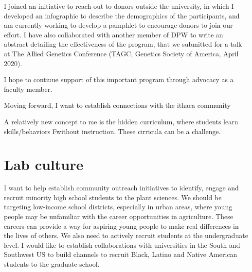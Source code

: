 \documentclass[11pt]{article}
\begin{document}

I joined an initiative to reach out to donors outside the university, in which I developed an infographic to describe the demographics of the participants, and am currently working to develop a pamphlet to encourage donors to join our effort. I have also collaborated with another member of DPW to write an abstract detailing the effectiveness of the program, that we submitted for a talk at The Allied Genetics Conference (TAGC, Genetics Society of America, April 2020).

I hope to continue support of this important program through advocacy as a faculty member.  

Moving forward, I want to establish connections with the ithaca community 


A relatively new concept to me is the hidden curriculum, where students learn skills/behaviors Fwithout instruction. These cirricula can be a challenge. 

\section{Lab culture}








I want to help establish community outreach initiatives to identify, engage and recruit minority high school students to the plant sciences. We should be targeting low-income school districts, especially in urban areas, where young people may be unfamiliar with the career opportunities in agriculture. These careers can provide a way for aspiring young people to make real differences in the lives of others. We also need to actively recruit students at the undergraduate level. I would like to establish collaborations with universities in the South and Southwest US to build channels to recruit Black, Latino and Native American students to the graduate school. 
\end{document}
